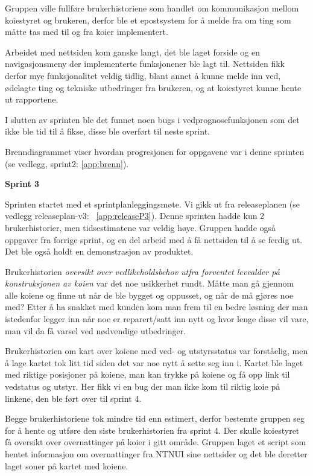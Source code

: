 \documentclass[12pt,a4paper,norsk]{article}
\begin{document}
Gruppen ville fullføre brukerhistoriene som handlet om kommunikasjon mellom koiestyret og brukeren, derfor ble et epostsystem for å melde fra om ting som måtte tas med til og fra koier implementert.

Arbeidet med nettsiden kom ganske langt, det ble laget forside og en navigasjonsmeny der implementerte funksjonener ble lagt til. Nettsiden fikk derfor mye funksjonalitet veldig tidlig, blant annet å kunne melde inn ved, ødelagte ting og tekniske utbedringer fra brukeren, og at koiestyret kunne hente ut rapportene.

I slutten av sprinten ble det funnet noen bugs i vedprognosefunksjonen som det ikke ble tid til å fikse, disse ble overført til neste sprint.

Brenndiagrammet viser hvordan progresjonen for oppgavene var i denne sprinten (se vedlegg, sprint2: \cref{app:brenn}).

\bigskip \noindent \textbf{Sprint 3}
\par Sprinten startet med et sprintplanleggingsmøte. Vi gikk ut fra releaseplanen (se vedlegg releaseplan-v3: ~\cref{app:releaseP3}). Denne sprinten hadde kun 2 brukerhistorier, men tidsestimatene var veldig høye. Gruppen hadde også oppgaver fra forrige sprint, og en del arbeid med å få nettsiden til å se ferdig ut. Det ble også holdt en demonstrasjon av produktet.

Brukerhistorien \textit{oversikt over vedlikeholdsbehov utfra forventet levealder på konstruksjonen av koien} var det noe usikkerhet rundt. Måtte man gå gjennom alle koiene og finne ut når de ble bygget og oppusset, og når de må gjøres noe med? Etter å ha snakket med kunden kom man frem til en bedre løsning der man istedenfor legger inn når noe er reparert/satt inn nytt og hvor lenge disse vil vare, man vil da få varsel ved nødvendige utbedringer.

Brukerhistorien om kart over koiene med ved- og utstyrsstatus var forståelig, men å lage kartet tok litt tid siden det var noe nytt å sette seg inn i. Kartet ble laget med riktige posisjoner på koiene, man kan trykke på koiene og få opp link til vedstatus og utstyr. Her fikk vi en bug der man ikke kom til riktig koie på linkene, den ble ført over til sprint 4.

Begge brukerhistoriene tok mindre tid enn estimert, derfor bestemte gruppen seg for å hente og utføre den siste brukerhistorien fra sprint 4. Der skulle koiestyret få oversikt over overnattinger på koier i gitt område. Gruppen laget et script som hentet informasjon om overnattinger fra NTNUI sine nettsider og det ble deretter laget soner på kartet med koiene.
\end{document}
